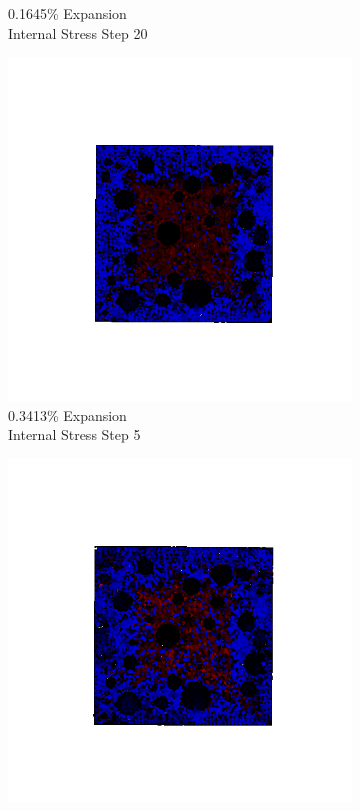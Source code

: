 \begin{figure}[ht!]
\begin{subfigure}{.25\textwidth}
      \caption{0.1645\% Expansion\\Internal Stress Step 20}
    \end{subfigure}
    \begin{subfigure}{.25\textwidth}
      \centering
      \includegraphics[width=1.0\linewidth]{Files/exp_3D/DEF/A15X0C_2_s5.png}
      \caption{0.3413\% Expansion\\Internal Stress Step 5}
    \end{subfigure}%
    \begin{subfigure}{.25\textwidth}
      \centering
      \includegraphics[width=1.0\linewidth]{Files/exp_3D/DEF/A15X0C_2_s10.png}

\end{subfigure}
\end{figure}
